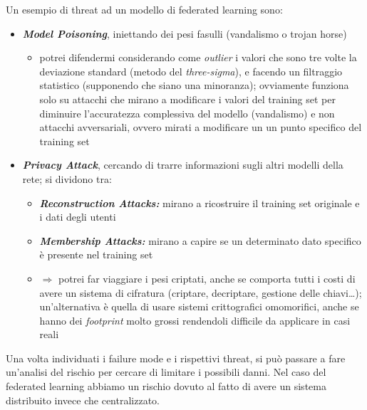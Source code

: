 \documentclass{report}
\begin{document}
\noindent Un esempio di threat ad un modello di federated learning sono:
\begin{itemize}
    \item \textbf{\textit{Model Poisoning}}, iniettando dei pesi fasulli (vandalismo o trojan horse)
    \begin{itemize}
        \item potrei difendermi considerando come \textit{outlier} i valori che sono tre volte la deviazione standard (metodo del \textit{three-sigma}), 
        e facendo un filtraggio statistico (supponendo che siano una minoranza); ovviamente funziona solo su attacchi che mirano a modificare i valori 
        del training set per diminuire l'accuratezza complessiva del modello (vandalismo) e non attacchi avversariali, ovvero mirati a modificare un 
        un punto specifico del training set 
    \end{itemize}
    \item \textbf{\textit{Privacy Attack}}, cercando di trarre informazioni sugli altri modelli della rete; si dividono tra:
    \begin{itemize}
        \item \textit{\textbf{Reconstruction Attacks:}} mirano a ricostruire il training set originale e i dati degli utenti 
        \item \textbf{\textit{Membership Attacks:}} mirano a capire se un determinato dato specifico è presente nel training set
        \item $\Rightarrow$ potrei far viaggiare i pesi criptati, anche se comporta tutti i costi di avere un sistema di cifratura (criptare, decriptare, 
        gestione delle chiavi\dots); un'alternativa è quella di usare sistemi crittografici omomorifici, anche se hanno dei \textit{footprint}
        molto grossi rendendoli difficile da applicare in casi reali
    \end{itemize}
\end{itemize}

\noindent Una volta individuati i failure mode e i rispettivi threat, si può passare a fare un'analisi del rischio per cercare di limitare i possibili 
danni. Nel caso del federated learning abbiamo un rischio dovuto al fatto di avere un sistema distribuito invece che centralizzato.
\end{document}
